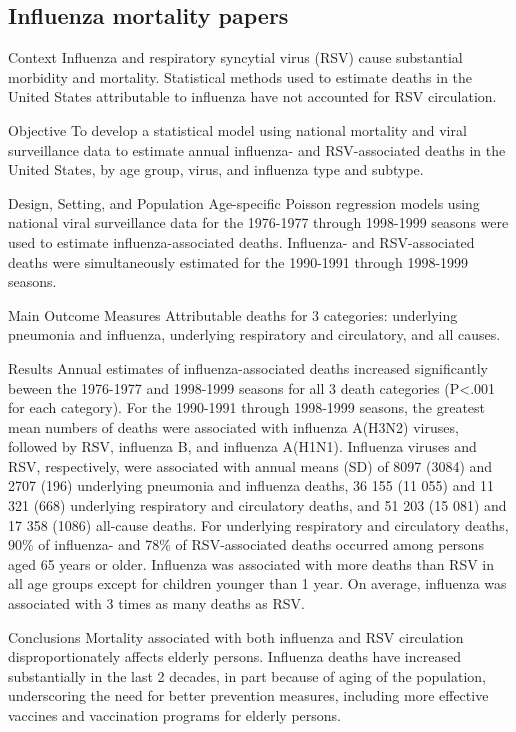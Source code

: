 \subsection{Influenza mortality papers}

\cite{thompsonMortalityAssociatedInfluenza2003}
Context  Influenza and respiratory syncytial virus (RSV) cause substantial
morbidity and mortality. Statistical methods used to estimate deaths in the
United States attributable to influenza have not accounted for RSV circulation.

Objective  To develop a statistical model using national mortality and viral
surveillance data to estimate annual influenza- and RSV-associated deaths in
the United States, by age group, virus, and influenza type and subtype.

Design, Setting, and Population  Age-specific Poisson regression models using
national viral surveillance data for the 1976-1977 through 1998-1999 seasons
were used to estimate influenza-associated deaths. Influenza- and
RSV-associated deaths were simultaneously estimated for the 1990-1991 through
1998-1999 seasons.

Main Outcome Measures  Attributable deaths for 3 categories: underlying
pneumonia and influenza, underlying respiratory and circulatory, and all
causes.

Results  Annual estimates of influenza-associated deaths increased
significantly beween the 1976-1977 and 1998-1999 seasons for all 3 death
categories (P<.001 for each category). For the 1990-1991 through 1998-1999
seasons, the greatest mean numbers of deaths were associated with influenza
A(H3N2) viruses, followed by RSV, influenza B, and influenza A(H1N1). Influenza
viruses and RSV, respectively, were associated with annual means (SD) of 8097
(3084) and 2707 (196) underlying pneumonia and influenza deaths, 36 155 (11
055) and 11 321 (668) underlying respiratory and circulatory deaths, and 51 203
(15 081) and 17 358 (1086) all-cause deaths. For underlying respiratory and
circulatory deaths, 90\% of influenza- and 78\% of RSV-associated deaths occurred
among persons aged 65 years or older. Influenza was associated with more deaths
than RSV in all age groups except for children younger than 1 year. On average,
influenza was associated with 3 times as many deaths as RSV.

Conclusions  Mortality associated with both influenza and RSV circulation
disproportionately affects elderly persons. Influenza deaths have increased
substantially in the last 2 decades, in part because of aging of the
population, underscoring the need for better prevention measures, including
more effective vaccines and vaccination programs for elderly persons.

